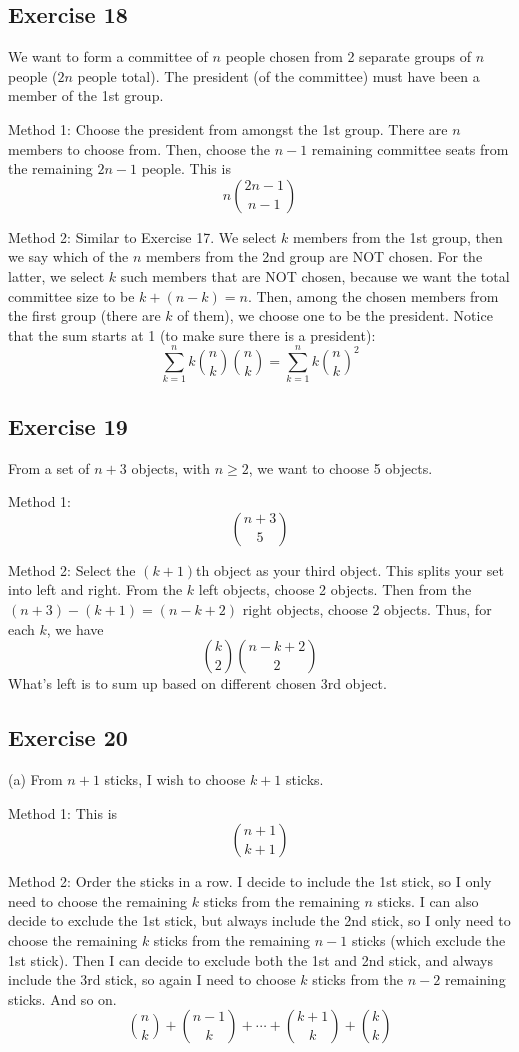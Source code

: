 \documentclass{book}
\begin{document}
\subsection*{Exercise 18}
We want to form a committee of $n$ people chosen from 2 separate groups of $n$ people ($2n$ people total). The president (of the committee) must have been a member of the 1st group.

Method 1: Choose the president from amongst the 1st group. There are $n$ members to choose from. Then, choose the $n - 1$ remaining committee seats from the remaining $2n - 1$ people. This is
$$n \binom{2n - 1}{n - 1}$$

Method 2: Similar to Exercise 17. We select $k$ members from the 1st group, then we say which of the $n$ members from the 2nd group are NOT chosen. For the latter, we select $k$ such members that are NOT chosen, because we want the total committee size to be $k + (n - k) = n$. Then, among the chosen members from the first group (there are $k$ of them), we choose one to be the president. Notice that the sum starts at 1 (to make sure there is a president):
$$\sum_{k = 1}^n k \binom{n}{k} \binom{n}{k} = \sum_{k = 1}^n k \binom{n}{k}^2$$

\subsection*{Exercise 19}
From a set of $n + 3$ objects, with $n \geq 2$, we want to choose 5 objects.

Method 1: $$\binom{n + 3}{5}$$

Method 2: Select the $(k + 1)$th object as your third object. This splits your set into left and right. From the $k$ left objects, choose 2 objects. Then from the $(n + 3) - (k + 1) = (n - k + 2)$ right objects, choose 2 objects. Thus, for each $k$, we have
$$\binom{k}{2} \binom{n - k + 2}{2}$$
What's left is to sum up based on different chosen 3rd object.

\subsection*{Exercise 20}
(a) From $n + 1$ sticks, I wish to choose $k + 1$ sticks.

Method 1: This is
$$\binom{n + 1}{k + 1}$$

Method 2: Order the sticks in a row. I decide to include the 1st stick, so I only need to choose the remaining $k$ sticks from the remaining $n$ sticks. I can also decide to exclude the 1st stick, but always include the 2nd stick, so I only need to choose the remaining $k$ sticks from the remaining $n - 1$ sticks (which exclude the 1st stick). Then I can decide to exclude both the 1st and 2nd stick, and always include the 3rd stick, so again I need to choose $k$ sticks from the $n - 2$ remaining sticks. And so on.
$$\binom{n}{k} + \binom{n - 1}{k} + \cdots + \binom{k + 1}{k} + \binom{k}{k}$$
\end{document}
